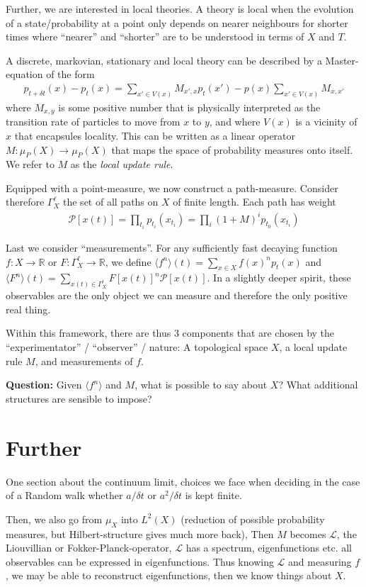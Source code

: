 \documentclass[10pt,a4paper]{article}
\theoremstyle{definition}
\theoremstyle{plain}
\begin{document}
Further, we are interested in local theories. A theory is local when the evolution of a state/probability at a point only depends on nearer neighbours for shorter times where ``nearer'' and ``shorter'' are to be understood in terms of $X$ and $T$. 

A discrete, markovian, stationary and local theory can be described by a Master-equation of the form
\begin{align}
	p_{t+\delta t}(x) - p_t(x) = \sum_{x' \in V(x)}^{} M_{x',x} p_t(x') - p(x) \sum_{x' \in V(x)}^{} M_{x,x'}
	\label{master_equation}
\end{align}
where $M_{x,y}$ is some positive number that is physically interpreted as the transition rate of particles to move from $x$ to $y$, and where $V(x)$ is a vicinity of $x$ that encapsules locality. This can be written as a linear operator $M: \mu_P(X) \to \mu_P(X)$ that maps the space of probability measures onto itself. We refer to $M$ as the 	\textit{local update rule}. 

Equipped with a point-measure, we now construct a path-measure. Consider therefore $\Gamma_X^{\ell}$ the set of all paths on $X$ of finite length. Each path has weight
\begin{align}
	\mathcal{P}[x(t)] = \prod_{t_i} p_{t_i}(x_{t_i}) = \prod_i (1+M)^i p_{t_0}(x_{t_i})
	\label{}
\end{align}

Last we consider ``measurements''. For any sufficiently fast decaying function $f:X \to \mathbb{R}$ or $F: \Gamma_X^{\ell} \to \mathbb{R}$, we define $\langle f^n\rangle(t) = \sum_{x \in X}^{} f(x)^{n} p_t(x)$ and $\langle F^n\rangle(t) = \sum_{x(t) \in \Gamma_X^l}^{} F[x(t)]^n \mathcal{P}[x(t)]$. In a slightly deeper spirit, these observables are the only object we can measure and therefore the only positive real thing.

Within this framework, there are thus 3 components that are chosen by the ``experimentator'' / ``observer'' / nature: A topological space $X$, a local update rule $M$, and measurements of $f$. 

\textbf{Question:} Given $\langle f^n \rangle$ and $M$, what is possible to say about $X$? What additional structures are sensible to impose?

\section{Further}
One section about the continuum limit, choices we face when deciding in the case of a Random walk whether $a / \delta t$ or $ a^2/\delta t$ is kept finite.

Then, we also go from $\mu_X$ into $L^2(X)$ (reduction of possible probability measures, but Hilbert-structure gives much more back), Then $M$ becomes $\mathcal{L}$, the Liouvillian or Fokker-Planck-operator, $\mathcal{L}$ has a spectrum, eigenfunctions etc. all observables can be expressed in eigenfunctions. Thus knowing $\mathcal{L}$ and measuring $f$, we may be able to reconstruct eigenfunctions, then we know things about $X$.
\end{document}
